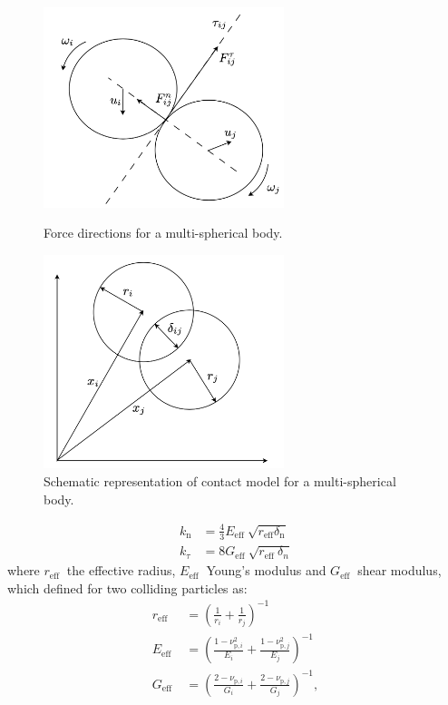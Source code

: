 \begin{figure}[!htp]
\centering
\parbox{7cm}{
\includegraphics[width=7cm]{Images/particle_model_2.png}
\caption{Force directions for a multi-spherical body.}
\label{fig:2figsA}}
\qquad
\begin{minipage}{7cm}
\includegraphics[width=7cm]{Images/particle_model.png}
\caption{Schematic representation of contact model for a multi-spherical body.}
\label{fig:2figsB}
\end{minipage}
\end{figure}
\begin{equation}
\begin{aligned}
k_{\mathrm{n}} & =\frac{4}{3} E_{\text {eff }} \sqrt{r_{\mathrm{eff}} \delta_{\mathrm{n}}} \\
k_{\tau} & =8 G_{\text {eff }} \sqrt{r_{\text {eff }} \delta_{n}}
\end{aligned}
\end{equation}
where $r_{\text {eff }}$ the effective radius, $E_{\text {eff }}$ Young’s modulus and $G_{\text {eff }}$ shear modulus, which defined for two colliding particles as:
\begin{equation}
\begin{aligned}
r_{\mathrm{eff}} & =\left(\frac{1}{r_i}+\frac{1}{r_j}\right)^{-1} \\
E_{\text {eff }} & =\left(\frac{1-\nu_{\mathrm{p}, i}^2}{E_i}+\frac{1-\nu_{\mathrm{p}, j}^2}{E_j}\right)^{-1} \\
G_{\text {eff }} & =\left(\frac{2-\nu_{\mathrm{p}, i}}{G_i}+\frac{2-\nu_{\mathrm{p}, j}}{G_j}\right)^{-1},
\end{aligned}
\end{equation}

